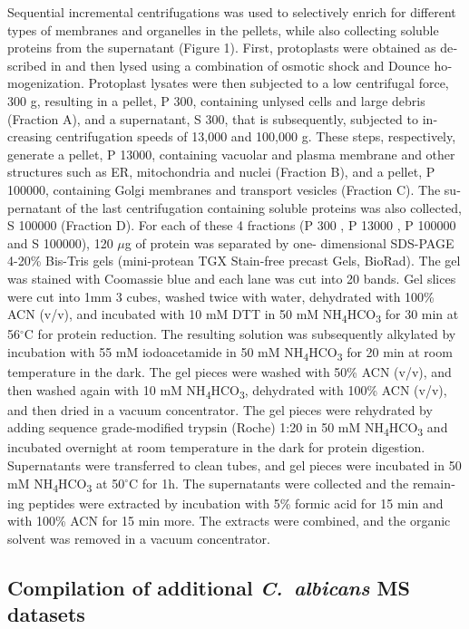 \begin{otherlanguage}{british}
Sequential incremental centrifugations was used to selectively enrich for different types of
membranes and organelles in the pellets, while also collecting soluble proteins from the
supernatant (Figure 1). First, protoplasts were obtained as described in \citep{Pitarch2006} and
then lysed using a combination of osmotic shock and Dounce homogenization. Protoplast
lysates were then subjected to a low centrifugal force, 300 g, resulting in a pellet, P 300,
containing unlysed cells and large debris (Fraction A), and a supernatant, S 300, that is
subsequently, subjected to increasing centrifugation speeds of 13,000 and 100,000 g. These
steps, respectively, generate a pellet, P 13000, containing vacuolar and plasma membrane and
other structures such as ER, mitochondria and nuclei (Fraction B), and a pellet, P 100000,
containing Golgi membranes and transport vesicles (Fraction C). The supernatant of the last
centrifugation containing soluble proteins was also collected, S 100000 (Fraction D). For each of
these 4 fractions (P 300 , P 13000 , P 100000 and S 100000), 120 $\mu$g of protein was separated by one-
dimensional SDS-PAGE 4-20\% Bis-Tris gels (mini-protean TGX Stain-free precast Gels,
BioRad). The gel was stained with Coomassie blue and each lane was cut into 20 bands. Gel
slices were cut into 1mm 3 cubes, washed twice with water, dehydrated with 100\% ACN (v/v),
 and incubated with 10 mM DTT in 50 mM NH\textsubscript{4}HCO\textsubscript{3} for 30 min at 56$^{\circ}$C for protein
reduction. The resulting solution was subsequently alkylated by incubation with 55 mM
iodoacetamide in 50 mM NH\textsubscript{4}HCO\textsubscript{3} for 20 min at room temperature in the dark. The gel
pieces were washed with 50\% ACN (v/v), and then washed again with 10 mM NH\textsubscript{4}HCO\textsubscript{3},
dehydrated with 100\% ACN (v/v), and then dried in a vacuum concentrator. The gel pieces were
rehydrated by adding sequence grade-modified trypsin (Roche) 1:20 in 50 mM NH\textsubscript{4}HCO\textsubscript{3} and
incubated overnight at room temperature in the dark for protein digestion. Supernatants were
transferred to clean tubes, and gel pieces were incubated in 50 mM NH\textsubscript{4}HCO\textsubscript{3} at 50$^{\circ}$C for
1h. The supernatants were collected and the remaining peptides were extracted by
incubation with 5\% formic acid for 15 min and with 100\% ACN for 15 min more. The extracts
were combined, and the organic solvent was removed in a vacuum concentrator.


\subsection*{Compilation of additional \textit{\mbox{C. albicans}} MS datasets}


\end{otherlanguage}
